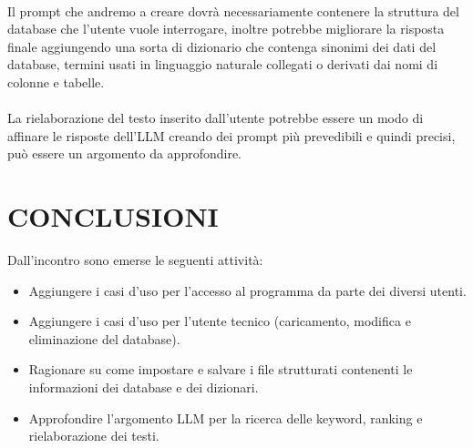 \documentclass[5pt]{article}
\begin{document}
\\ 
Il prompt che andremo a creare dovrà necessariamente contenere la struttura del database che l'utente vuole interrogare, inoltre potrebbe migliorare la risposta finale aggiungendo una sorta di dizionario che contenga sinonimi dei dati del database, termini usati in linguaggio naturale collegati o derivati dai nomi di colonne e tabelle. 
\\ \\
La rielaborazione del testo inserito dall'utente potrebbe essere un modo di affinare le risposte dell'LLM creando dei prompt più prevedibili e quindi precisi, può essere un argomento da approfondire.

\section{CONCLUSIONI}
Dall'incontro sono emerse le seguenti attività: 
\begin{itemize}
    \item Aggiungere i casi d'uso per l'accesso al programma da parte dei diversi utenti.
    \item Aggiungere i casi d'uso per l'utente tecnico (caricamento, modifica e eliminazione del database).
    \item Ragionare su come impostare e salvare i file strutturati contenenti le informazioni dei database e dei dizionari.
    \item Approfondire l'argomento LLM per la ricerca delle keyword, ranking e rielaborazione dei testi.
\end{itemize}
\end{document}
